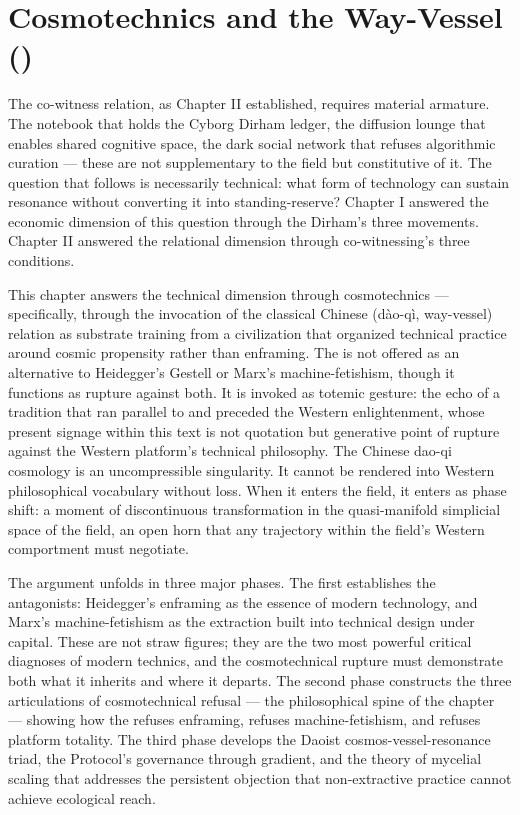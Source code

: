 \chapter{Cosmotechnics and the Way-Vessel ()}
\label{ch:03}

The co-witness relation, as Chapter II established, requires material armature. The notebook that holds the Cyborg Dirham ledger, the diffusion lounge that enables shared cognitive space, the dark social network that refuses algorithmic curation — these are not supplementary to the field but constitutive of it. The question that follows is necessarily technical: what form of technology can sustain resonance without converting it into standing-reserve? Chapter I answered the economic dimension of this question through the Dirham's three movements. Chapter II answered the relational dimension through co-witnessing's three conditions.

This chapter answers the technical dimension through cosmotechnics — specifically, through the invocation of the classical Chinese  (dào-qì, way-vessel) relation as substrate training from a civilization that organized technical practice around cosmic propensity rather than enframing. The  is not offered as an alternative to Heidegger's Gestell or Marx's machine-fetishism, though it functions as rupture against both. It is invoked as totemic gesture: the echo of a tradition that ran parallel to and preceded the Western enlightenment, whose present signage within this text is not quotation but generative point of rupture against the Western platform's technical philosophy. The Chinese dao-qi cosmology is an uncompressible singularity. It cannot be rendered into Western philosophical vocabulary without loss. When it enters the field, it enters as phase shift: a moment of discontinuous transformation in the quasi-manifold simplicial space of the field, an open horn that any trajectory within the field's Western comportment must negotiate.

The argument unfolds in three major phases. The first establishes the antagonists: Heidegger's enframing as the essence of modern technology, and Marx's machine-fetishism as the extraction built into technical design under capital. These are not straw figures; they are the two most powerful critical diagnoses of modern technics, and the cosmotechnical rupture must demonstrate both what it inherits and where it departs. The second phase constructs the three articulations of cosmotechnical refusal — the philosophical spine of the chapter — showing how the  refuses enframing, refuses machine-fetishism, and refuses platform totality. The third phase develops the Daoist cosmos-vessel-resonance triad, the   Protocol's governance through gradient, and the theory of mycelial scaling that addresses the persistent objection that non-extractive practice cannot achieve ecological reach.

